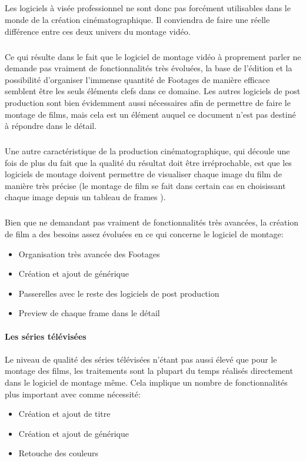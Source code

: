 \subparagraph{}
Les logiciels à visée professionnel ne sont donc pas forcément utilisables dans
le monde de la création cinématographique. Il conviendra de faire une réelle
différence entre ces deux univers du montage vidéo.

\subparagraph{}
Ce qui résulte dans le fait que le logiciel de montage vidéo à proprement parler ne
demande pas vraiment de fonctionnalités très évoluées, la base de l'édition
et la possibilité d'organiser l'immense quantité de Footages de manière efficace
semblent être les seuls éléments clefs dans ce domaine. Les autres logiciels de
post production sont bien évidemment aussi nécessaires afin de permettre de faire
le montage de films, mais cela est un élément auquel ce document n'est pas destiné
à répondre dans le détail.

\subparagraph{}
Une autre caractéristique de la production cinématographique, qui découle une
fois de plus du fait que la qualité du résultat doit être irréprochable, est
que les logiciels de montage doivent permettre de visualiser chaque image du
film de manière très précise (le montage de film se fait dans certain cas en
choisissant chaque image depuis un tableau de frames ).


\subparagraph{}
Bien que ne demandant pas vraiment de fonctionnalités très avancées, la création
de film a des besoins assez évoluées en ce qui concerne le logiciel de montage:
\begin{itemize}
  \item{Organisation très avancée des Footages}
  \item{Création et ajout de générique}
  \item{Passerelles avec le reste des logiciels de post production}
  \item{Preview de chaque frame dans le détail}
\end{itemize}


\paragraph {Les séries télévisées}

\paragraph{}
Le niveau de qualité des séries télévisées n'étant pas aussi élevé que pour
le montage des films, les traitements sont la plupart du temps réalisés
directement dans le logiciel de montage même. Cela implique un nombre de
fonctionnalités plus important avec comme nécessité:
\begin{itemize}
  \item{Création et ajout de titre}
  \item{Création et ajout de générique}
  \item{Retouche des couleurs}
\end{itemize}

